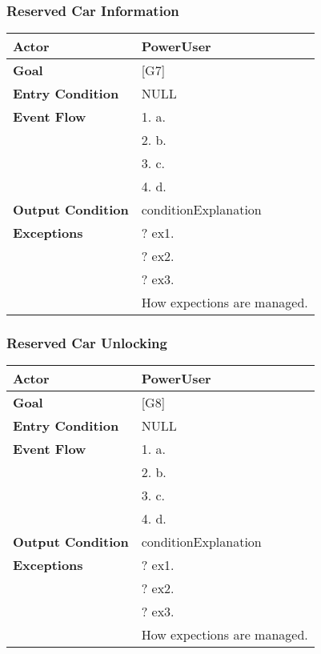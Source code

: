 \subsubsection{Reserved Car Information}
\begin{tabular}{| l | p{8cm} |}
\hline
\textbf{Actor}      &       PowerUser \\
\hline
\textbf{Goal}       &       [G7]\\
\hline
\textbf{Entry Condition} &  NULL\\
\hline
\textbf{Event Flow}     &   1.	a.\\&
                                            2.	b.\\&
                                            3.	c.\\&
                                            4.  d.\\
\hline
\textbf{Output Condition} & conditionExplanation\\
\hline
\textbf{Exceptions} &       ?   ex1.\\& 
                            ?	ex2.\\&
                            ?	ex3.\\& 
                           How expections are managed.\\
\hline
\end{tabular} 


\subsubsection{Reserved Car Unlocking}
\begin{tabular}{| l | p{8cm} |}
\hline
\textbf{Actor}      &       PowerUser \\
\hline
\textbf{Goal}       &       [G8]\\
\hline
\textbf{Entry Condition} &  NULL\\
\hline
\textbf{Event Flow}     &   1.	a.\\&
                                            2.	b.\\&
                                            3.	c.\\&
                                            4.  d.\\
\hline
\textbf{Output Condition} & conditionExplanation\\
\hline
\textbf{Exceptions} &       ?   ex1.\\& 
                            ?	ex2.\\&
                            ?	ex3.\\& 
                           How expections are managed.\\
\hline
\end{tabular} 


